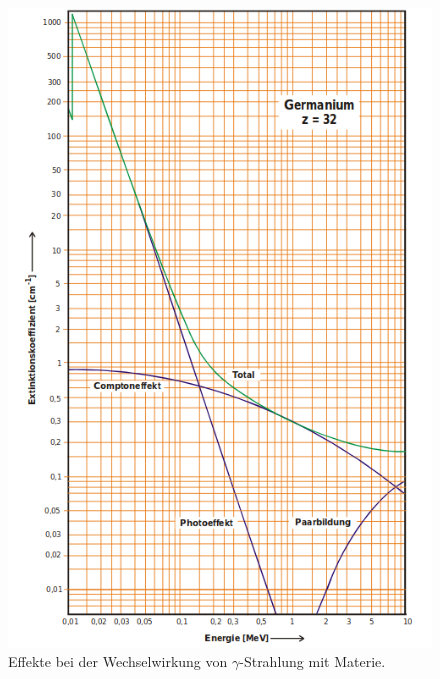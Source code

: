 \begin{figure}
  \centering
  \includegraphics[scale=0.8]{Wechselwirkungen.png}
  \caption{Effekte bei der Wechselwirkung von $\gamma$-Strahlung mit Materie. \cite{Q1}}
  \label{abb:1}
\end{figure}


